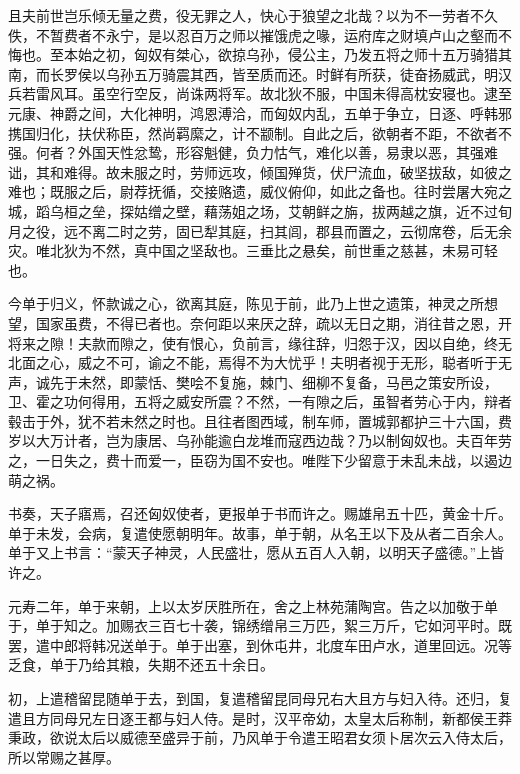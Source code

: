\documentclass[12pt,UTF8]{ctexbook}
\begin{document}
且夫前世岂乐倾无量之费，役无罪之人，快心于狼望之北哉？以为不一劳者不久佚，不暂费者不永宁，是以忍百万之师以摧饿虎之喙，运府库之财填卢山之壑而不悔也。至本始之初，匈奴有桀心，欲掠乌孙，侵公主，乃发五将之师十五万骑猎其南，而长罗侯以乌孙五万骑震其西，皆至质而还。时鲜有所获，徒奋扬威武，明汉兵若雷风耳。虽空行空反，尚诛两将军。故北狄不服，中国未得高枕安寝也。逮至元康、神爵之间，大化神明，鸿恩溥洽，而匈奴内乱，五单于争立，日逐、呼韩邪携国归化，扶伏称臣，然尚羁縻之，计不颛制。自此之后，欲朝者不距，不欲者不强。何者？外国天性忿鸷，形容魁健，负力怙气，难化以善，易隶以恶，其强难诎，其和难得。故未服之时，劳师远攻，倾国殚货，伏尸流血，破坚拔敌，如彼之难也；既服之后，尉荐抚循，交接赂遗，威仪俯仰，如此之备也。往时尝屠大宛之城，蹈乌桓之垒，探姑缯之壁，藉荡姐之场，艾朝鲜之旃，拔两越之旗，近不过旬月之役，远不离二时之劳，固已犁其庭，扫其闾，郡县而置之，云彻席卷，后无余灾。唯北狄为不然，真中国之坚敌也。三垂比之悬矣，前世重之慈甚，未易可轻也。



今单于归义，怀款诚之心，欲离其庭，陈见于前，此乃上世之遗策，神灵之所想望，国家虽费，不得已者也。奈何距以来厌之辞，疏以无日之期，消往昔之恩，开将来之隙！夫款而隙之，使有恨心，负前言，缘往辞，归怨于汉，因以自绝，终无北面之心，威之不可，谕之不能，焉得不为大忧乎！夫明者视于无形，聪者听于无声，诚先于未然，即蒙恬、樊哙不复施，棘门、细柳不复备，马邑之策安所设，卫、霍之功何得用，五将之威安所震？不然，一有隙之后，虽智者劳心于内，辩者毂击于外，犹不若未然之时也。且往者图西域，制车师，置城郭都护三十六国，费岁以大万计者，岂为康居、乌孙能逾白龙堆而寇西边哉？乃以制匈奴也。夫百年劳之，一日失之，费十而爱一，臣窃为国不安也。唯陛下少留意于未乱未战，以遏边萌之祸。



书奏，天子寤焉，召还匈奴使者，更报单于书而许之。赐雄帛五十匹，黄金十斤。单于未发，会病，复遣使愿朝明年。故事，单于朝，从名王以下及从者二百余人。单于又上书言：“蒙天子神灵，人民盛壮，愿从五百人入朝，以明天子盛德。”上皆许之。



元寿二年，单于来朝，上以太岁厌胜所在，舍之上林苑蒲陶宫。告之以加敬于单于，单于知之。加赐衣三百七十袭，锦绣缯帛三万匹，絮三万斤，它如河平时。既罢，遣中郎将韩况送单于。单于出塞，到休屯井，北度车田卢水，道里回远。况等乏食，单于乃给其粮，失期不还五十余日。



初，上遣稽留昆随单于去，到国，复遣稽留昆同母兄右大且方与妇入待。还归，复遣且方同母兄左日逐王都与妇人侍。是时，汉平帝幼，太皇太后称制，新都侯王莽秉政，欲说太后以威德至盛异于前，乃风单于令遣王昭君女须卜居次云入侍太后，所以常赐之甚厚。
\end{document}
